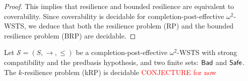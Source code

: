 \begin{proof}
This implies that resilience and bounded resilience are equivalent to coverability.
%
%
%
%
Since coverability is decidable for completion-post-effective $\omega^2$-WSTS, we deduce that both the 
  resilience problem (RP) and the bounded resilience problem (BRP) are decidable.

\iffalse
	\end{proof}

	\begin{theorem}\label{k-down-up}
	Let $\mathscr{S}=(S,\rightarrow, \leq)$ be a completion-post-effective $\omega^2$-WSTS 
	with strong compatibility and the predbasis hypothesis, and two finite sets: $\textsf{Bad}$ 
	and $\textsf{Safe}$.
	The  $k$-resilience problem (kRP) is decidable 
	\textcolor{red}{CONJECTURE for now}
	 \end{theorem}

